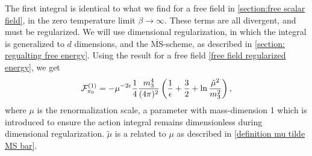 The first integral is identical to what we find for a free field in \autoref{section:free scalar field}, in the zero temperature limit $\beta \rightarrow \infty$.
These terms are all divergent, and must be regularized. 
We will use dimensional regularization, in which the integral is generalized to $d$ dimensions, and the $\overline{\mathrm{MS}}$-scheme, as described in \autoref{section: regualting free energy}.
Using the result for a free field \cref{free field regularized energy}, we get
\begin{equation}
    \label{Free energy pi 0}
    \mathcal{F}^{(1)}_{\pi_0} 
    = 
    - \mu^{-2 \epsilon}  \frac{1}{4} \frac{m_3^4}{(4\pi)^2} 
    \left( \frac{1}{\epsilon} + \frac{3}{2} + \ln \frac{\tilde \mu^2}{m_3^2} \right),
\end{equation}
where $\mu$ is the renormalization scale, a parameter with mass-dimension 1 which is introduced to ensure the action integral remains dimensionless during dimensional regularization.
$\tilde \mu$ is a related to $\mu$ as described in \cref{definition mu tilde MS bar}.

